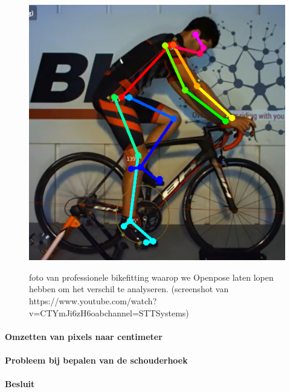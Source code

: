 \documentclass[a4paper,twoside,kulak]{kulakreport}
\begin{document}
\begin{figure}[H]
	\centering
	\includegraphics[width= \textwidth]{prof_bikefit}
	\label{proffessionele_bikefit}
	\caption{foto van professionele bikefitting waarop we Openpose laten lopen hebben om het verschil te analyseren. (screenshot van https://www.youtube.com/watch?v=CTYmJi6zH6oabchannel=STTSystems)}
\end{figure}

\paragraph{Omzetten van pixels naar centimeter}

\paragraph{Probleem bij bepalen van de schouderhoek}

\paragraph{Besluit}
\end{document}
